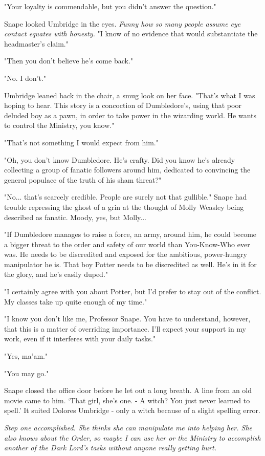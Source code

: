 \documentclass[a4paper,11pt]{article}
\begin{document}
"Your loyalty is commendable, but you didn't answer the question."

Snape looked Umbridge in the eyes. \emph{Funny how so many people assume eye contact equates with honesty.} "I know of no evidence that would substantiate the headmaster's claim."

"Then you don't believe he's come back."

"No. I don't."

Umbridge leaned back in the chair, a smug look on her face. "That's what I was hoping to hear. This story is a concoction of Dumbledore's, using that poor deluded boy as a pawn, in order to take power in the wizarding world. He wants to control the Ministry, you know."

"That's not something I would expect from him."

"Oh, you don't know Dumbledore. He's crafty. Did you know he's already collecting a group of fanatic followers around him, dedicated to convincing the general populace of the truth of his sham threat?"

"No... that's scarcely credible. People are surely not that gullible." Snape had trouble repressing the ghost of a grin at the thought of Molly Weasley being described as fanatic. Moody, yes, but Molly...

"If Dumbledore manages to raise a force, an army, around him, he could become a bigger threat to the order and safety of our world than You-Know-Who ever was. He needs to be discredited and exposed for the ambitious, power-hungry manipulator he is. That boy Potter needs to be discredited as well. He's in it for the glory, and he's easily duped."

"I certainly agree with you about Potter, but I'd prefer to stay out of the conflict. My classes take up quite enough of my time."

"I know you don't like me, Professor Snape. You have to understand, however, that this is a matter of overriding importance. I'll expect your support in my work, even if it interferes with your daily tasks."

"Yes, ma'am."

"You may go."

Snape closed the office door before he let out a long breath. A line from an old movie came to him. `That girl, she's one. - A witch? You just never learned to spell.' It suited Dolores Umbridge - only a witch because of a slight spelling error.

\emph{Step one accomplished. She thinks she can manipulate me into helping her. She also knows about the Order, so maybe I can use her or the Ministry to accomplish another of the Dark Lord's tasks without anyone really getting hurt.}
\end{document}
